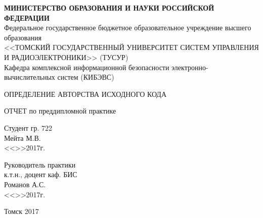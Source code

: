 \newpage
{}

\begin{center}
 \textbf{МИНИСТЕРСТВО ОБРАЗОВАНИЯ И НАУКИ РОССИЙСКОЙ ФЕДЕРАЦИИ}\\
 Федеральное государственное бюджетное образовательное учреждение высшего образования\\
 <<ТОМСКИЙ ГОСУДАРСТВЕННЫЙ УНИВЕРСИТЕТ СИСТЕМ УПРАВЛЕНИЯ И РАДИОЭЛЕКТРОНИКИ>> (ТУСУР)\\
 
 
 Кафедра комплексной информационной безопасности электронно-вычислительных систем (КИБЭВС)\\
\end{center}

\vfill


\begin{center}
ОПРЕДЕЛЕНИЕ АВТОРСТВА ИСХОДНОГО КОДА

ОТЧЕТ
по преддипломной практике
\end{center}


\vfill

\begin{flushright}
\begin{minipage}{0.45\textwidth}
 \begin{flushleft}
  Студент гр. 722 \\
  \underline{\hspace{3cm}} Мейта М.В. \\
  <<\underline{\hspace{1cm}}>>\underline{\hspace{3cm}}2017г.\\
 \end{flushleft}
\end{minipage}
\end{flushright}


\begin{flushright}
\begin{minipage}{0.45\textwidth}
 \begin{flushleft}
  Руководитель практики \\
  к.т.н., доцент каф. БИС \\
  \underline{\hspace{3cm}} Романов А.С. \\
  <<\underline{\hspace{1cm}}>>\underline{\hspace{3cm}}2017г.\\
 \end{flushleft}
\end{minipage}
\end{flushright}


\vfill

\begin{center}
 Томск 2017
\end{center}
